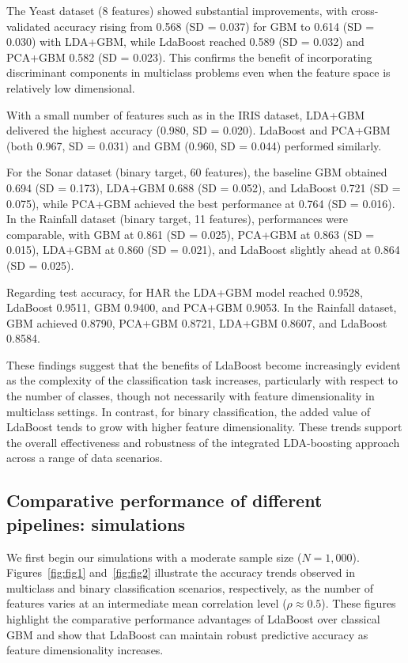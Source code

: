 \documentclass[11pt,a4paper]{article}
\begin{document}
\bigskip
\noindent
The Yeast dataset (8 features) showed substantial improvements, with cross-validated accuracy rising from 0.568 (SD = 0.037) for GBM to 0.614 (SD = 0.030) with LDA+GBM, while LdaBoost reached 0.589 (SD = 0.032) and PCA+GBM 0.582 (SD = 0.023). This confirms the benefit of incorporating discriminant components in multiclass problems even when the feature space is relatively low dimensional.

With a small number of features such as in the IRIS dataset, LDA+GBM delivered the highest accuracy (0.980, SD = 0.020). LdaBoost and PCA+GBM (both 0.967, SD = 0.031) and GBM (0.960, SD = 0.044) performed similarly.

For the Sonar dataset (binary target, 60 features), the baseline GBM obtained 0.694 (SD = 0.173), LDA+GBM 0.688 (SD = 0.052), and LdaBoost 0.721 (SD = 0.075), while PCA+GBM achieved the best performance at 0.764 (SD = 0.016). In the Rainfall dataset (binary target, 11 features), performances were comparable, with GBM at 0.861 (SD = 0.025), PCA+GBM at 0.863 (SD = 0.015), LDA+GBM at 0.860 (SD = 0.021), and LdaBoost slightly ahead at 0.864 (SD = 0.025).

Regarding test accuracy, for HAR the LDA+GBM model reached 0.9528, LdaBoost 0.9511, GBM 0.9400, and PCA+GBM 0.9053. In the Rainfall dataset, GBM achieved 0.8790, PCA+GBM 0.8721, LDA+GBM 0.8607, and LdaBoost 0.8584.

These findings suggest that the benefits of LdaBoost become increasingly evident as the complexity of the classification task increases, particularly with respect to the number of classes, though not necessarily with feature dimensionality in multiclass settings. In contrast, for binary classification, the added value of LdaBoost tends to grow with higher feature dimensionality. These trends support the overall effectiveness and robustness of the integrated LDA-boosting approach across a range of data scenarios.

\subsection*{Comparative performance of different pipelines: simulations}
We first begin our simulations with a moderate sample size ($N=1{,}000$). Figures~\ref{fig:fig1} and~\ref{fig:fig2} illustrate the accuracy trends observed in multiclass and binary classification scenarios, respectively, as the number of features varies at an intermediate mean correlation level ($\rho\approx 0.5$). These figures highlight the comparative performance advantages of LdaBoost over classical GBM and show that LdaBoost can maintain robust predictive accuracy as feature dimensionality increases.
\end{document}

